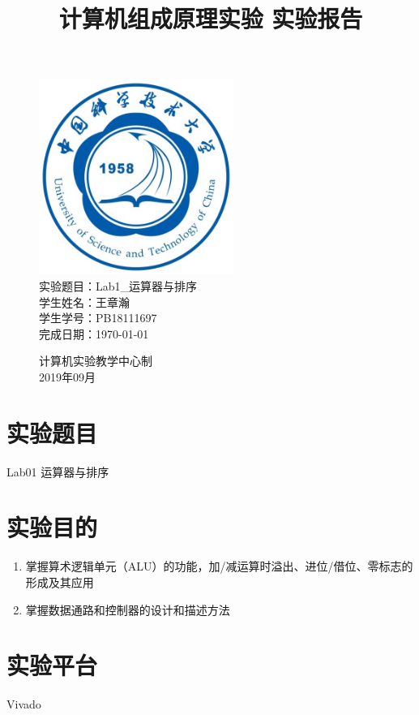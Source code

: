 \documentclass[UTF8]{article}
\title{计算机组成原理实验 实验报告}
\date{}
\begin{document}
\maketitle
\begin{figure}[H]
	\centering
	\includegraphics[width=2.5in]{xiaohui.png}\vspace{0.5cm}\\
	\large{
		实验题目：Lab1\_运算器与排序\\
		学生姓名：王章瀚\\
		学生学号：PB18111697\\
		完成日期：\today\\
	}\vspace{2cm}
	
	\large{计算机实验教学中心制\\2019年09月\\}
	\thispagestyle{empty}
	\clearpage  %
\end{figure}
\newpage

\section{实验题目}
Lab01 运算器与排序

\section{实验目的}
\begin{enumerate}
	\item 掌握算术逻辑单元（ALU）的功能，加/减运算时溢出、进位/借位、零标志的形成及其应用
	\item 掌握数据通路和控制器的设计和描述方法
\end{enumerate}

\section{实验平台}
Vivado
\end{document}
